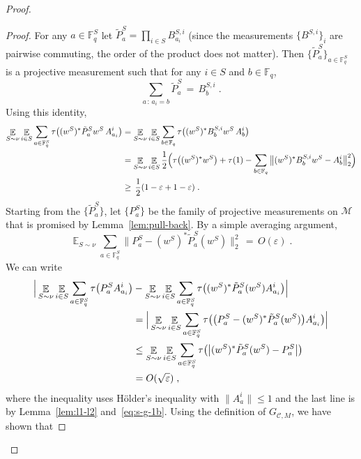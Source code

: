 \documentclass[11pt]{article}
\theoremstyle{definition}
\newcommand{\code}{\mathcal{C}}
\DeclareMathOperator*{\Expectation}{\mathbb{E}}
\newcommand{\Es}[1]{\Expectation_{#1}}
\newcommand{\F}{\ensuremath{\mathbb{F}}}
\newcommand{\mM}{\ensuremath{\mathcal{M}}}
\newcommand{\eps}{\varepsilon}
\begin{document}
\begin{proof}
\begin{proof}
For any $a\in\F^S_q$ let $\tilde{P}^S_a = \prod_{i\in S} B^{S,i}_{a_i}$ (since the measurements $\{B^{S,i}\}_i$ are pairwise commuting, the order of the product does not matter). Then $\{\tilde{P}^S_a\}_{a\in\F_q^S}$ is a projective measurement such that for any $i\in S$ and $b\in \F_q$, 
\[ \sum_{a\,:\, a_i=b} \tilde{P}^S_a \,=\, B^{S,i}_b\;.\]
Using this identity, 
\begin{align}
\Es{S\sim \nu} \Es{i\in S} \sum_{a\in \F_q^S} \tau\big(  (w^S)^* \tilde{P}^S_a w^S \, A^i_{a_i}\big) 
&= \Es{S\sim \nu} \Es{i\in S} \sum_{b\in \F_q}\tau\big(  (w^S)^* B^{S,i}_b w^S\, A^i_{b}\big)\notag \\
&= \Es{S\sim \nu} \Es{i\in S} \frac{1}{2}\Big(\tau\big((w^S)^*w^S\big) + \tau(1) - \sum_{b\in \F_q} \big\|  (w^S)^* B^{S,i}_b w^S - A^i_{b}\big\|_2^2\Big) \notag\\
&\geq \,\frac{1}{2}(1-\eps+1-\eps)\;.\label{eq:s-g-1}
\end{align}
Starting from the $\{\tilde{P}^S_a\}$, let $\{P^S_a\}$ be the family of projective measurements on $\mM$ that is promised by Lemma~\ref{lem:pull-back}. By a simple averaging argument,
\begin{equation}\label{eq:s-g-1b}
\Es{S\sim \nu}\sum_{a\in \F_q^S} \big\| P^S_a - (w^S)^* \tilde{P}^S_a (w^S)\big\|_2^2 \,=\, O(\eps)\;. 
\end{equation}
We can write
\begin{align}
\Big|\Es{S\sim \nu} \Es{i\in S} \sum_{a\in \F_q^S} \tau\big( P^S_a A^i_{a_i}\big)
&- \Es{S\sim \nu} \Es{i\in S} \sum_{a\in \F_q^S} \tau\big( (w^S)^* \tilde{P}^S_a (w^S)A^i_{a_i}\big)\Big|\notag\\
&= \Big| \Es{S\sim \nu} \Es{i\in S} \sum_{a\in \F_q^S} \tau\big(\big(P^S_a - (w^S)^* \tilde{P}^S_a (w^S)\big)A^i_{a_i}\big)\Big|\notag\\
&\leq \Es{S\sim \nu} \Es{i\in S} \sum_{a\in \F_q^S} \tau\big(\big|(w^S)^* \tilde{P}^S_a (w^S)-P^S_a\big|\big)\notag\\
&= O(\sqrt{\eps})\;,\label{eq:s-g-2}
\end{align}
where the inequality uses H\"{o}lder's inequality with $\|A^i_a\|\leq 1$ and the last line is by Lemma~\ref{lem:l1-l2} and~\eqref{eq:s-g-1b}.
Using the definition of $G_{\code,M}$, we have shown that 

\end{proof}
\end{proof}
\end{document}
